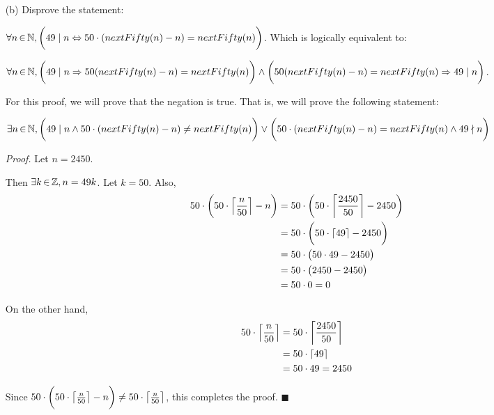 \documentclass[12pt]{article}
\begin{document}
\begin{enumerate}
\item[(b)] Disprove the statement:

$\forall n \,{\in}\, \mathbb N, \bigg(49 \mid n \Leftrightarrow 50 \cdot (nextFifty(n) - n) = nextFifty(n)\bigg)$. Which is logically equivalent to:

$\forall n \,{\in}\, \mathbb N, \bigg(49 \mid n \Rightarrow 50(nextFifty(n) - n) = nextFifty(n)\bigg) \wedge \\ \bigg(50 (nextFifty(n) - n) = nextFifty(n) \Rightarrow 49 \mid n\bigg)$.

For this proof, we will prove that the negation is true. That is, we will prove the following statement:

$\exists n \,{\in}\, \mathbb N, \bigg(49 \mid n \wedge 50 \cdot (nextFifty(n) - n) \neq nextFifty(n) \bigg) \vee \\ \bigg( 50 \cdot (nextFifty(n) - n) = nextFifty(n) \wedge 49 \nmid n \bigg)$

\emph{Proof.} Let $n = 2450$.

Then $\exists k \,{\in}\, \mathbb Z, n = 49k$. Let $k = 50$. Also,
\begin{align*}
50 \cdot \bigg( 50 \cdot \left \lceil \frac{n}{50} \right \rceil - n \bigg) &= 50 \cdot \bigg( 50 \cdot \left \lceil \frac{2450}{50} \right \rceil - 2450 \bigg) \\
&= 50 \cdot \bigg( 50 \cdot \left \lceil 49 \right \rceil - 2450 \bigg) \\
&= 50 \cdot \big( 50 \cdot 49 - 2450 \big) \\
&= 50 \cdot \big( 2450 - 2450 \big) \\
&= 50 \cdot 0 = 0
\end{align*}

On the other hand,
\begin{align*}
50 \cdot \left \lceil \frac{n}{50} \right \rceil &= 50 \cdot \left \lceil \frac{2450}{50} \right \rceil \\
&= 50 \cdot \left \lceil 49 \right \rceil \\
&= 50 \cdot 49 = 2450
\end{align*}

Since $50 \cdot \bigg( 50 \cdot \left \lceil \frac{n}{50} \right \rceil - n \bigg) \neq 50 \cdot \left \lceil \frac{n}{50} \right \rceil$, this completes the proof.
$\blacksquare$

\end{enumerate}

\newpage
\end{document}
